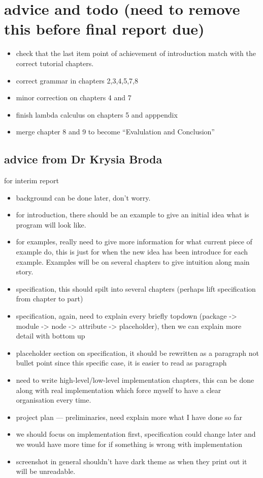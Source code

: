 \documentclass[master.tex]{subfiles}
\begin{document}
\section{advice and todo (need to remove this before final report due)}

\begin{itemize}
\item check that the last item point of achievement of introduction match with
  the correct tutorial chapters.
\item correct grammar in chapters 2,3,4,5,7,8
\item minor correction on chapters 4 and 7
\item finish lambda calculus on chapters 5 and apppendix
\item merge chapter 8 and 9 to become ``Evalulation and Conclusion''
\end{itemize}


\subsection{advice from Dr Krysia Broda}
for interim report
\begin{itemize}
  \item background can be done later, don't worry.
  \item for introduction, there should be an example to give an initial idea
    what is program will look like.
  \item for examples, really need to give more information for what current
    piece of example do, this is just for when the new idea has been introduce
    for each example. Examples will be on several chapters to give intuition
    along main story.
  \item specification, this should spilt into several chapters (perhaps lift
    specification from chapter to part)
  \item specification, again, need to explain every briefly topdown (package ->
    module -> node -> attribute -> placeholder),  then we can explain more
    detail with bottom up
  \item placeholder section on specification, it should be rewritten as a
    paragraph not bullet point since this specific case, it is easier to read
    as paragraph
  \item need to write high-level/low-level implementation chapters, this can be
    done along with real implementation which force myself to have a clear
    organisation every time.
  \item project plan --- preliminaries, need explain more what I have done so
    far
  \item we should focus on implementation first, specification could change
    later and we would have more time for if something is wrong with
    implementation
  \item screenshot in general shouldn't have dark theme as when they print out
    it will be unreadable.
\end{itemize}
\end{document}

